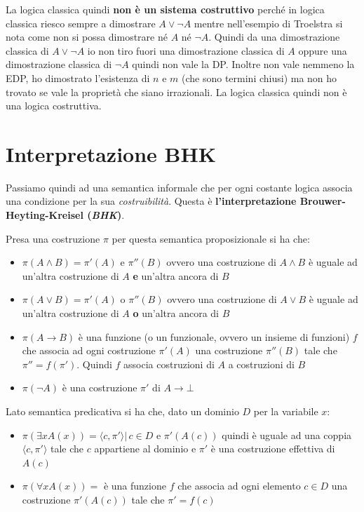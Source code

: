 \documentclass[a4paper,12pt, oneside]{book}
\begin{document}
La logica classica quindi \textbf{non è un sistema costruttivo} perché in logica
classica riesco sempre a dimostrare $A\lor\neg A$ mentre nell'esempio di
Troelstra si nota come non si possa dimostrare né $A$ né $\neg A$. Quindi da una
dimostrazione classica di $A\lor\neg A$ io non tiro fuori una dimostrazione
classica di $A$ oppure una dimostrazione classica di $\neg A$ quindi non vale la
DP. Inoltre non vale nemmeno la EDP, ho dimostrato l'esistenza di $n$ e $m$ (che
sono termini chiusi) ma non ho trovato se vale la proprietà che siano
irrazionali. La logica classica quindi non è una logica costruttiva.
\section{Interpretazione BHK}
Passiamo quindi ad una semantica informale che per ogni costante logica associa
una condizione per la sua \textit{costruibilità}. Questa è
\textbf{l'interpretazione Brouwer-Heyting-Kreisel (\textit{BHK})}.
\begin{definizione}
  Presa una costruzione $\pi$ per questa semantica proposizionale si ha che:
  \begin{itemize}
    \item $\pi(A\land B)=\pi'(A)\mbox{ e } \pi''(B)$ ovvero una costruzione di
    $A\land B$ è uguale ad un'altra costruzione di $A$ \textbf{e} un'altra
    ancora di $B$ 
    \item $\pi(A\lor B)=\pi'(A)\mbox{ o } \pi''(B)$ ovvero una costruzione di
    $A\lor B$ è uguale ad un'altra costruzione di $A$ \textbf{o} un'altra ancora
    di $B$
    \item $\pi(A\to B)$ è una funzione  (o un funzionale, ovvero un
    insieme di funzioni) $f$ che associa ad ogni
    costruzione $\pi'(A)$ una costruzione $\pi''(B)$ tale che
    $\pi''=f(\pi')$. Quindi $f$ associa costruzioni di $A$ a costruzioni di $B$
    \item $\pi(\neg A)$ è una costruzione $\pi'$ di $A\to\bot$
  \end{itemize}
  Lato semantica predicativa si ha che, dato un dominio $D$ per la variabile
  $x$: 
  \begin{itemize}
    \item $\pi(\exists xA(x))=\langle c,\pi'\rangle|\,c\in D\mbox{ e
    }\pi'(A(c))$ quindi è uguale ad una coppia $\langle c,\pi'\rangle$ tale che
    $c$ appartiene al dominio e $\pi'$ è una costruzione effettiva di $A(c)$
    \item $\pi(\forall xA(x))=$ è una funzione $f$ che associa ad ogni elemento
    $c\in D$ una costruzione $\pi'(A(c))$ tale che $\pi'=f(c)$
  \end{itemize}
\end{definizione}
\end{document}
